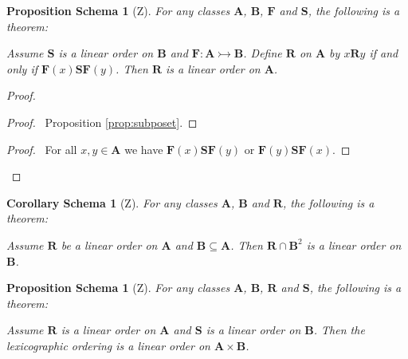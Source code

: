 \documentclass{book}
\let\qed\relax
\newtheorem{props}[ax]{Proposition Schema}
\newtheorem{cors}{Corollary Schema}[ax]
\theoremstyle{definition}
\begin{document}
\begin{props}[Z]
\label{prop:subloset}
For any classes $\mathbf{A}$, $\mathbf{B}$, $\mathbf{F}$ and $\mathbf{S}$, the following is a theorem:

Assume $\mathbf{S}$ is a linear order on $\mathbf{B}$ and $\mathbf{F} : \mathbf{A} \rightarrowtail \mathbf{B}$. Define $\mathbf{R}$ on $\mathbf{A}$ by $x \mathbf{R} y$ if and only if $\mathbf{F}(x) \mathbf{S} \mathbf{F}(y)$. Then $\mathbf{R}$ is a linear order on $\mathbf{A}$.
\end{props}

\begin{proof}
\pf
{}
\begin{proof}
	\pf\ Proposition \ref{prop:subposet}.
\end{proof}
\begin{proof}
	\pf\ For all $x,y \in \mathbf{A}$ we have $\mathbf{F}(x) \mathbf{S} \mathbf{F}(y)$ or $\mathbf{F}(y) \mathbf{S} \mathbf{F}(x)$.
\end{proof}
\qed
\end{proof}

\begin{cors}[Z]
\label{cor:subloset}
For any classes $\mathbf{A}$, $\mathbf{B}$ and $\mathbf{R}$, the following is a theorem:

Assume $\mathbf{R}$ be a linear order on $\mathbf{A}$ and $\mathbf{B} \subseteq \mathbf{A}$. Then $\mathbf{R} \cap \mathbf{B}^2$ is a linear order on $\mathbf{B}$.
\end{cors}

\begin{props}[Z]
\label{prop:lexicographlinear}
For any classes $\mathbf{A}$, $\mathbf{B}$, $\mathbf{R}$ and $\mathbf{S}$, the following is a theorem:

Assume $\mathbf{R}$ is a linear order on $\mathbf{A}$ and $\mathbf{S}$ is a linear order on $\mathbf{B}$. Then the lexicographic ordering is a linear order on $\mathbf{A} \times \mathbf{B}$.
\end{props}
\end{document}

